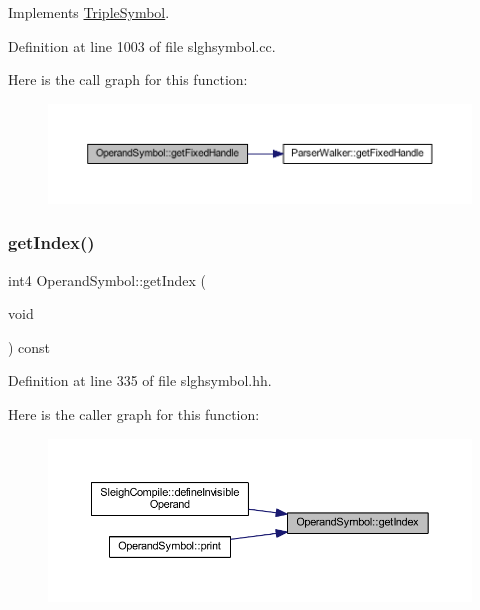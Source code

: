 Implements \mbox{\hyperlink{class_triple_symbol_aa71f48c79a2bee73e97fdfb8163b4e46}{Triple\+Symbol}}.



Definition at line 1003 of file slghsymbol.\+cc.

Here is the call graph for this function\+:
\nopagebreak
\begin{figure}[H]
\begin{center}
\leavevmode
\includegraphics[width=350pt]{class_operand_symbol_a292e9cb914a17155467e7e1f0572021c_cgraph}
\end{center}
\end{figure}
\mbox{\label{class_operand_symbol_ab4bccbaf51039ac104de608792dcc698}} 
\subsubsection{\texorpdfstring{getIndex()}{getIndex()}}
{\footnotesize\ttfamily int4 Operand\+Symbol\+::get\+Index (\begin{DoxyParamCaption}\item[{void}]{ }\end{DoxyParamCaption}) const\hspace{0.3cm}{\ttfamily [inline]}}



Definition at line 335 of file slghsymbol.\+hh.

Here is the caller graph for this function\+:
\nopagebreak
\begin{figure}[H]
\begin{center}
\leavevmode
\includegraphics[width=350pt]{class_operand_symbol_ab4bccbaf51039ac104de608792dcc698_icgraph}
\end{center}
\end{figure}
\mbox{\label{class_operand_symbol_a449067986ae0236c97cbdec8de4c4723}} 
